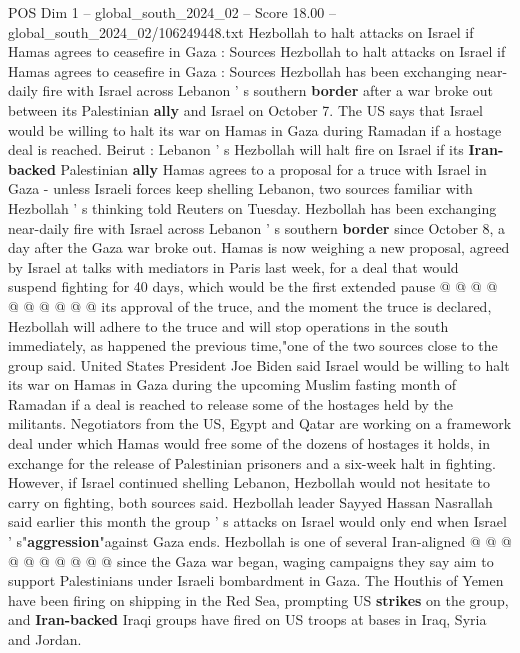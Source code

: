 \begin{textsample}{POS Dim 1 – global\_south\_2024\_02 – Score 18.00 – global\_south\_2024\_02/106249448.txt}  \label{ex:f1_pos_204}
Hezbollah to halt attacks on Israel if Hamas agrees to ceasefire in Gaza : Sources Hezbollah to halt attacks on Israel if Hamas agrees to ceasefire in Gaza : Sources Hezbollah has been exchanging near-daily fire with Israel across Lebanon ' s southern \textbf{border} after a war broke out between its Palestinian \textbf{ally} and Israel on October 7.
The US says that Israel would be willing to halt its war on Hamas in Gaza during Ramadan if a hostage deal is reached.
Beirut : Lebanon ' s Hezbollah will halt fire on Israel if its \textbf{Iran-backed} Palestinian \textbf{ally} Hamas agrees to a proposal for a truce with Israel in Gaza - unless Israeli forces keep shelling Lebanon, two sources familiar with Hezbollah ' s thinking told Reuters on Tuesday.
Hezbollah has been exchanging near-daily fire with Israel across Lebanon ' s southern \textbf{border} since October 8, a day after the Gaza war broke out.
Hamas is now weighing a new proposal, agreed by Israel at talks with mediators in Paris last week, for a deal that would suspend fighting for 40 days, which would be the first extended pause @ @ @ @ @ @ @ @ @ @ its approval of the truce, and the moment the truce is declared, Hezbollah will adhere to the truce and will stop operations in the south immediately, as happened the previous time,"one of the two sources close to the group said.
United States President Joe Biden said Israel would be willing to halt its war on Hamas in Gaza during the upcoming Muslim fasting month of Ramadan if a deal is reached to release some of the hostages held by the militants.
Negotiators from the US, Egypt and Qatar are working on a framework deal under which Hamas would free some of the dozens of hostages it holds, in exchange for the release of Palestinian prisoners and a six-week halt in fighting.
However, if Israel continued shelling Lebanon, Hezbollah would not hesitate to carry on fighting, both sources said.
Hezbollah leader Sayyed Hassan Nasrallah said earlier this month the group ' s attacks on Israel would only end when Israel ' s"\textbf{aggression}"against Gaza ends.
Hezbollah is one of several Iran-aligned @ @ @ @ @ @ @ @ @ @ since the Gaza war began, waging campaigns they say aim to support Palestinians under Israeli bombardment in Gaza.
The Houthis of Yemen have been firing on shipping in the Red Sea, prompting US \textbf{strikes} on the group, and \textbf{Iran-backed} Iraqi groups have fired on US troops at bases in Iraq, Syria and Jordan.

\end{textsample}
